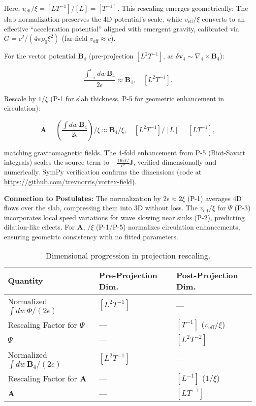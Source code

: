 Here, $v_{\text{eff}} / \xi = [L T^{-1}] / [L] = [T^{-1}]$. This rescaling emerges geometrically: The slab normalization preserves the 4D potential's scale, while $v_{\text{eff}} / \xi$ converts to an effective ``acceleration potential'' aligned with emergent gravity, calibrated via $G = c^2 / (4\pi \rho_0 \xi^2)$ (far-field $v_{\text{eff}} \approx c$).

For the vector potential $\mathbf{B}_4$ (pre-projection $[L^2 T^{-1}]$, as $\delta \mathbf{v}_4 \sim \nabla_4 \times \mathbf{B}_4$):

\begin{equation}
\frac{\int_{-\epsilon}^{\epsilon} dw \, \mathbf{B}_4}{2\epsilon} \approx \mathbf{B}_4, \quad [L^2 T^{-1}].
\end{equation}

Rescale by $1 / \xi$ (P-1 for slab thickness, P-5 for geometric enhancement in circulation):

\begin{equation}
\mathbf{A} = \left( \frac{\int dw \, \mathbf{B}_4}{2\epsilon} \right) / \xi \approx \mathbf{B}_4 / \xi, \quad [L^2 T^{-1}] / [L] = [L T^{-1}],
\end{equation}

matching gravitomagnetic fields. The 4-fold enhancement from P-5 (Biot-Savart integrals) scales the source term to $-\frac{16\pi G}{c^2} \mathbf{J}$, verified dimensionally and numerically. SymPy verification confirms the dimensions (code at \url{https://github.com/trevnorris/vortex-field}).

\textbf{Connection to Postulates:} The normalization by $2\epsilon \approx 2\xi$ (P-1) averages 4D flows over the slab, compressing them into 3D without loss. The $v_{\text{eff}} / \xi$ for $\Psi$ (P-3) incorporates local speed variations for wave slowing near sinks (P-2), predicting dilation-like effects. For $\mathbf{A}$, $/ \xi$ (P-1/P-5) normalizes circulation enhancements, ensuring geometric consistency with no fitted parameters.

\begin{table}[H]
\centering
\begin{tabular}{|l|l|l|}
\hline
Quantity & Pre-Projection Dim. & Post-Projection Dim. \\
\hline
Normalized $\int dw \, \Phi / (2\epsilon)$ & $[L^2 T^{-1}]$ & --- \\
Rescaling Factor for $\Psi$ & --- & $[T^{-1}]$ ($v_{\text{eff}} / \xi$) \\
$\Psi$ & --- & $[L^2 T^{-2}]$ \\
Normalized $\int dw \, \mathbf{B}_4 / (2\epsilon)$ & $[L^2 T^{-1}]$ & --- \\
Rescaling Factor for $\mathbf{A}$ & --- & $[L^{-1}]$ ($1 / \xi$) \\
$\mathbf{A}$ & --- & $[L T^{-1}]$ \\
\hline
\end{tabular}
\caption{Dimensional progression in projection rescaling.}
\label{tab:dim-projection}
\end{table}

